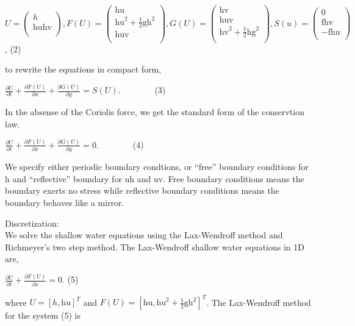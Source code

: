 \documentclass{article}
\begin{document}
\(U=\left(
\begin{array}{c}
 h \\
 \text{hu}\text{hv} \\
\end{array}
\right), F(U)=\left(
\begin{array}{c}
 \text{hu} \\
 \text{hu}^2+\frac{1}{2}\text{gh}^2 \\
 \text{huv} \\
\end{array}
\right), G(U)=\left(
\begin{array}{c}
 \text{hv} \\
 \text{huv} \\
 \text{hv}^2+\frac{1}{2}\text{hg}^2 \\
\end{array}
\right), S(u)=\left(
\begin{array}{c}
 0 \\
 \text{fhv} \\
 -\text{fhu} \\
\end{array}
\right)\), { } { }(2)

to rewrite the equations in compact form,

\(\frac{\partial U}{\partial t}+\frac{\partial F(U)}{\partial x}+\frac{\partial G(U)}{\partial y}=S(U).\)$\quad \quad \quad \quad $(3) { }

In the absense of the Coriolis force, we get the standard form of the conservtion law.

\(\frac{\partial U}{\partial t}+\frac{\partial F(U)}{\partial x}+\frac{\partial G(U)}{\partial y}=0.\)$\quad \quad \quad \quad $(4)

We specify either periodic boundary condtions, or {``}free{''} boundary conditions for h and {``}reflective{''} boundary for uh and uv. Free boundary
conditions means the boundary exerts no stress while reflective boundary conditions means the boundary behaves like a mirror. { }

Discretization:\\
We solve the shallow water equations using the Lax-Wendroff method and Richmeyer{'}s two step method. The Lax-Wendroff shallow water equations in
1D are, 

\(\frac{\partial U}{\partial t}+\frac{\partial F(U)}{\partial x}=0.\) { } { } (5)

where \(U=[h,\text{hu}]^T\) and \(F(U)=\left[\text{hu}, \text{hu}^2+\frac{1}{2}\text{gh}^2\right]^T\). The Lax-Wendroff method for the system (5)
is
\end{document}
